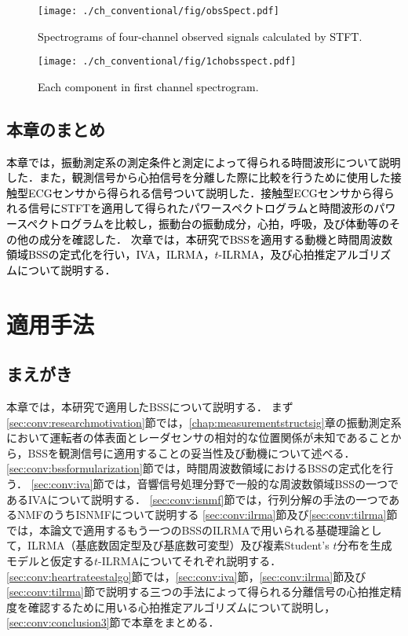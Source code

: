 \begin{figure}[tb]
\centering
\texttt{[image: ./ch\_conventional/fig/obsSpect.pdf]}
\caption{\textcolor{black}{Spectrograms of four-channel observed signals calculated by STFT.}}
\label{fig:4chobsspect}
\end{figure}

\begin{figure}[tb]
\centering
\texttt{[image: ./ch\_conventional/fig/1chobsspect.pdf]}
\caption{\textcolor{black}{Each component in first channel spectrogram.}}
\label{fig:1chobsspect}
\end{figure}

\clearpage
\section{本章のまとめ}
\label{sec:conv:conclusion2}
\textcolor{black}{本章では，振動測定系の測定条件と測定によって得られる時間波形について説明した．また，観測信号から心拍信号を分離した際に比較を行うために使用した接触型ECGセンサから得られる信号ついて説明した．接触型ECGセンサから得られる信号にSTFTを適用して得られたパワースペクトログラムと時間波形のパワースペクトログラムを比較し，振動台の振動成分，心拍，呼吸，及び体動等のその他の成分を確認した．
次章では，本研究でBSSを適用する動機と時間周波数領域BSSの定式化を行い，IVA，ILRMA，$t$-ILRMA，及び心拍推定アルゴリズムについて説明する．}


\chapter{適用手法}
\label{chap:methods}

\section{まえがき}
本章では，本研究で適用したBSSについて説明する．
まず\ref{sec:conv:researchmotivation}節では，{\ref{chap:measurementstructsig}章の振動測定系において運転者の体表面とレーダセンサの相対的な位置関係が未知であることから，BSSを観測信号に適用することの妥当性及び動機について述べる．}
\ref{sec:conv:bssformularization}節では，時間周波数領域におけるBSSの定式化を行う．
{\ref{sec:conv:iva}節では，音響信号処理分野で一般的な周波数領域BSSの一つであるIVAについて説明する．}
\ref{sec:conv:isnmf}節では，行列分解の手法の一つであるNMFのうちISNMFについて説明する
{\ref{sec:conv:ilrma}節及び\ref{sec:conv:tilrma}節では，本論文で適用するもう一つのBSSのILRMAで用いられる基礎理論として，ILRMA（基底数固定型及び基底数可変型）及び複素Student's $t$分布を生成モデルと仮定する$t$-ILRMAについてそれぞれ説明する．
\ref{sec:conv:heartrateestalgo}節では，\ref{sec:conv:iva}節，\ref{sec:conv:ilrma}節及び\ref{sec:conv:tilrma}節で説明する三つの手法によって得られる分離信号の心拍推定精度を確認するために用いる心拍推定アルゴリズムについて説明し，\ref{sec:conv:conclusion3}節で本章をまとめる．}

